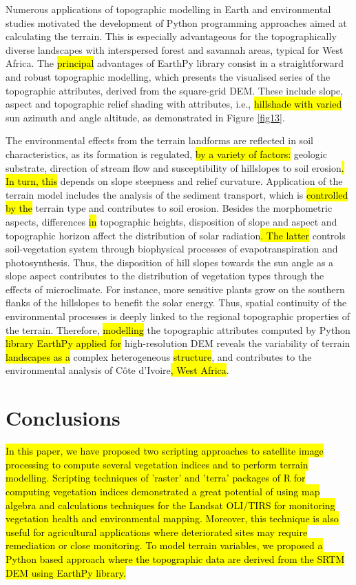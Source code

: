 \documentclass[jimaging,article,submit,pdftex,moreauthors]{Definitions/mdpi}
\begin{document}
Numerous applications of topographic modelling in Earth and environmental studies motivated the development of Python programming approaches aimed at calculating the terrain. This is especially advantageous for the topographically diverse landscapes with interspersed forest and savannah areas,\hl{ }typical for\hl{ }West Africa. The \hl{principal} advantages of EarthPy library consist in a straightforward and robust topographic modelling, which presents the visualised series of the topographic attributes, derived from the square-grid DEM. These include slope, aspect and topographic relief shading with\hl{ }attributes, i.e., \hl{hillshade with varied }sun azimuth and angle altitude, as demonstrated in Figure \ref{fig13}.

The environmental effects from the terrain landforms are reflected in soil characteristics, as its formation is regulated, \hl{by a variety of factors: }geologic substrate,\hl{ }direction of stream flow\hl{ }and susceptibility of hillslopes to\hl{ }soil erosion\hl{. In turn, this} depends on\hl{ }slope steepness and relief curvature. Application of the terrain model includes the analysis of the sediment transport, which is \hl{controlled by the} terrain type and contributes to soil erosion. Besides the morphometric aspects, differences \hl{in} topographic heights, disposition of slope and aspect and topographic horizon affect the distribution of solar radiation\hl{. The latter} controls soil-vegetation system through\hl{ }biophysical processes of evapotranspiration and photosynthesis. Thus, the disposition of hill slopes towards the sun angle as a slope aspect contributes to the distribution of vegetation types through the effects of microclimate. For instance, more sensitive plants grow on the southern flanks of the hillslopes to benefit the solar energy. Thus, spatial continuity of the environmental processes is deeply linked to the regional topographic properties of the terrain. Therefore, \hl{modelling }the topographic attributes computed by Python \hl{library EarthPy applied for} high-resolution DEM reveals\hl{ }the variability of terrain \hl{landscapes as a} complex heterogeneous \hl{structure}, and contributes\hl{ }to the environmental analysis of Côte d'Ivoire\hl{, West Africa}.

\section{Conclusions}

\hl{In this paper, we have proposed two scripting approaches to satellite image processing to compute several vegetation indices and to perform terrain modelling. Scripting techniques of 'raster' and 'terra' packages of R for computing vegetation indices demonstrated a great potential of using map algebra and calculations techniques for the Landsat OLI/TIRS for monitoring vegetation health and environmental mapping. Moreover, this technique is also useful for agricultural applications where deteriorated sites may require remediation or close monitoring. To model terrain variables, we proposed a Python based approach where the topographic data are derived from the SRTM DEM using EarthPy library.}
\end{document}

